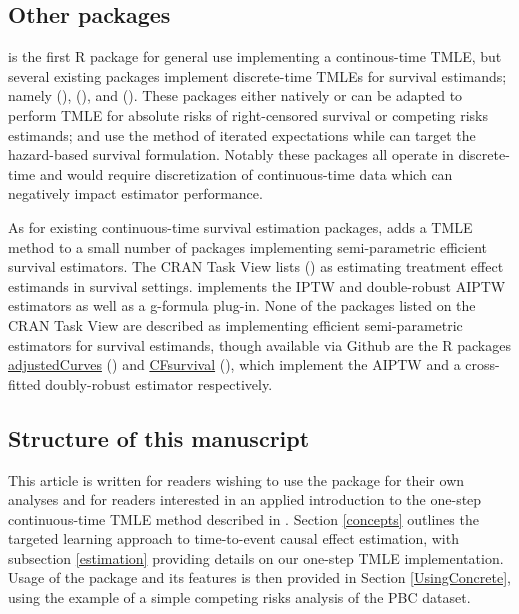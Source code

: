 \documentclass{report}
\newcommand{\1}{\ensuremath{\mathbf{1}}}
\begin{document}
\subsection{Other packages}
\label{otherpkgs}
 is the first R package for general use implementing a continous-time TMLE, but several existing packages implement discrete-time TMLEs for survival estimands; namely  (\cite{schwab_ltmle_2020}),  (\cite{sofrygin_stremr_2017}), and  (\cite{benkeser_survtmle_2019}). These packages either natively or can be adapted to perform TMLE for absolute risks of right-censored survival or competing risks estimands;  and  use the method of iterated expectations while  can target the hazard-based survival formulation. Notably these packages all operate in discrete-time and would require discretization of continuous-time data which can negatively impact estimator performance.

As for existing continuous-time survival estimation packages,  adds a TMLE method to a small number of packages implementing semi-parametric efficient survival estimators. The  CRAN Task View lists  (\cite{gerds_riskregression_2022}) as estimating treatment effect estimands in survival settings.  implements the IPTW and double-robust AIPTW estimators as well as a g-formula plug-in. None of the packages listed on the  CRAN Task View are described as implementing efficient semi-parametric estimators for survival estimands, though available via Github are the R packages \href{https://github.com/RobinDenz1/adjustedCurves}{adjustedCurves} (\cite{denz_comparison_2022}) and \href{https://github.com/tedwestling/CFsurvival}{CFsurvival} (\cite{westling_inference_2021}), which implement the AIPTW and a cross-fitted doubly-robust estimator respectively.

\subsection{Structure of this manuscript}
\label{sec:org875f4d5}
This article is written for readers wishing to use the  package for their own analyses and for readers interested in an applied introduction to the one-step continuous-time TMLE method described in \cite{rytgaard_one-step_2021}. Section \ref{concepts} outlines the targeted learning approach to time-to-event causal effect estimation, with subsection \ref{estimation} providing details on our one-step TMLE implementation. Usage of the  package and its features is then provided in Section \ref{UsingConcrete}, using the example of a simple competing risks analysis of the PBC dataset. 
\end{document}
